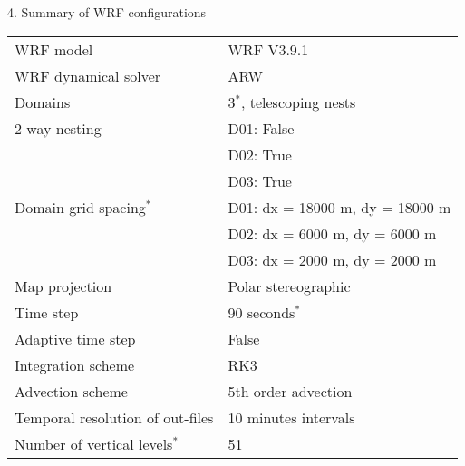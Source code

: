 \documentclass[xcolor=table]{beamer}
\begin{document}
\begin{frame}[fragile, allowframebreaks=.9, t]{4. Summary of WRF configurations}
\begin{longtable}{ p{4.1cm}  |  p{7.9cm}}
	\hline
	WRF model                           	& WRF V3.9.1                                                                 \\
	WRF dynamical solver           	& ARW                                                                        \\
	Domains                             		& 3$^*$, telescoping nests                                    \\
	2-way nesting                       	& D01: False                                                                 \\
	\rowcolor{light-gray}               & D02: True                                                                  \\
	\rowcolor{light-gray}               & D03: True                                                                  \\
	Domain grid spacing$^*$        & D01: dx = 18000 m, dy = 18000 m                \\
	\rowcolor{white}                    & D02:  dx = 6000 m, dy = 6000 m                         \\
	\rowcolor{white}                    & D03:  dx = 2000 m, dy = 2000 m                        \\
	Map projection                      & Polar stereographic                                                 \\
	Time step                           		& 90 seconds$^*$                                                             \\
	Adaptive time step                  & False                                                                      \\
	Integration scheme                  & RK3                                                                        \\
	Advection scheme                    & 5th order advection                                            \\
	Temporal resolution of out-files    & 10 minutes intervals                                     \\
	Number of vertical levels$^*$       & 51 \\	%

\end{longtable}
\end{frame}
\end{document}
